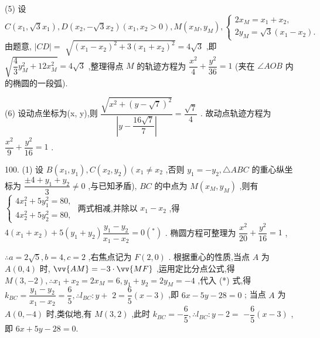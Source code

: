 (5) 设 $C\left( {{x}_{1},\sqrt{3}{x}_{1}}\right) ,D\left( {{x}_{2}, - \sqrt{3}{x}_{2}}\right) \left( {{x}_{1},{x}_{2} > 0}\right) ,M\left( {{x}_{M},{y}_{M}}\right) ,\left\{  \begin{array}{l} 2{x}_{M} = {x}_{1} + {x}_{2}, \\  2{y}_{M} = \sqrt{3}\left( {{x}_{1} - {x}_{2}}\right) . \end{array}\right.$ 由题意, $\left| {CD}\right|  =$  $\sqrt{{\left( {x}_{1} - {x}_{2}\right) }^{2} + 3{\left( {x}_{1} + {x}_{2}\right) }^{2}} = 4\sqrt{3}$ ,即 $\sqrt{\dfrac{4}{3}{y}_{M}^{2} + {12}{x}_{M}^{2}} = 4\sqrt{3}$ ,整理得点 $M$ 的轨迹方程为 $\dfrac{{x}^{2}}{4} + \dfrac{{y}^{2}}{36} = 1$ (夹在 $\angle {AOB}$ 内的椭圆的一段弧).

(6) 设动点坐标为(x, y),则 $\dfrac{\sqrt{{x}^{2} + {\left( y - \sqrt{7}\right) }^{2}}}{\left| y - \dfrac{{16}\sqrt{7}}{7}\right| } = \dfrac{\sqrt{7}}{4}$ . 故动点轨迹方程为 $\dfrac{{x}^{2}}{9} + \dfrac{{y}^{2}}{16} = 1$ .

100. (1) 设 $B\left( {{x}_{1},{y}_{1}}\right) ,C\left( {{x}_{2},{y}_{2}}\right) \left( {{x}_{1} \neq  {x}_{2}}\right.$ ,否则 ${y}_{1} =  - {y}_{2},\bigtriangleup {ABC}$ 的重心纵坐标为 $\dfrac{\pm 4 + {y}_{1} + {y}_{2}}{3} \neq  0$ ,与已知矛盾), ${BC}$ 的中点为 $M\left( {{x}_{M},{y}_{M}}\right)$ ,则有 $\left\{  \begin{array}{l} 4{x}_{1}^{2} + 5{y}_{1}^{2} = {80}, \\  4{x}_{2}^{2} + 5{y}_{2}^{2} = {80}, \end{array}\right.$ 两式相减,并除以 ${x}_{1} - {x}_{2}$ ,得 $4\left( {{x}_{1} + {x}_{2}}\right)  + 5\left( {{y}_{1} + {y}_{2}}\right) \dfrac{{y}_{1} - {y}_{2}}{{x}_{1} - {x}_{2}} = 0\left( {}^{ * }\right)$ . 椭圆方程可整理为 $\dfrac{{x}^{2}}{20} + \dfrac{{y}^{2}}{16} = 1$ ,

$\therefore a = 2\sqrt{5},b = 4,c = 2$ ,右焦点记为 $F\left( {2,0}\right)$ . 根据重心的性质,当点 $A$ 为 $A\left( {0,4}\right)$ 时, $\vv{AM} =  - 3 \cdot  \vv{MF}$ ,运用定比分点公式,得 $M\left( {3, - 2}\right) ,\therefore {x}_{1} + {x}_{2} = 2{x}_{M} = 6,{y}_{1} + {y}_{2} = 2{y}_{M} =  - 4$ ,代入 (*) 式,得 ${k}_{BC} = \dfrac{{y}_{1} - {y}_{2}}{{x}_{1} - {x}_{2}} = \dfrac{6}{5},\therefore {l}_{BC} : y +$  $2 = \dfrac{6}{5}\left( {x - 3}\right)$ ,即 ${6x} - {5y} - {28} = 0$ ; 当点 $A$ 为 $A\left( {0, - 4}\right)$ 时,类似地,有 $M\left( {3,2}\right)$ ,此时 ${k}_{BC} =  - \dfrac{6}{5},\therefore {l}_{BC} : y - 2 =$  $- \dfrac{6}{5}\left( {x - 3}\right)$ ,即 ${6x} + {5y} - {28} = 0.$


